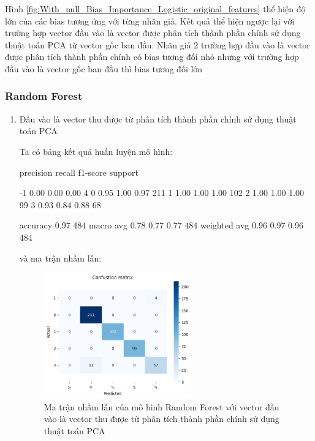 \begin{enumerate}[label=(\alph*)]
    Hình \ref{fig:With_null_Bias_Importance_Logistic_original_features} thể hiện độ lớn của các bias tương ứng với từng nhãn giả.
    Kết quả thể hiện ngược lại với trường hợp vector đầu vào là vector được phân tích thành phần chính sử dụng thuật toán PCA từ vector gốc ban đầu.
    Nhãn giả 2 trường hợp đầu vào là vector được phân tích thành phần chính có bias tương đối nhỏ nhưng với trường hợp đầu vào là vector gốc ban đầu thì bias tương đối lớn

\end{enumerate}

\subsubsection{Random Forest}

\begin{enumerate}[label=(\alph*)]
    \item Đầu vào là vector thu được từ phân tích thành phần chính sử dụng thuật toán PCA 
    
    Ta có bảng kết quả huấn luyện mô hình:

    \begin{python}
        precision    recall  f1-score   support

        -1       0.00      0.00      0.00         4
         0       0.95      1.00      0.97       211
         1       1.00      1.00      1.00       102
         2       1.00      1.00      1.00        99
         3       0.93      0.84      0.88        68

  accuracy                           0.97       484
 macro avg       0.78      0.77      0.77       484
weighted avg       0.96      0.97      0.96       484
    \end{python}

    và ma trận nhầm lẫn:

    \begin{figure}[H]
        \centering
        \includegraphics[width=0.6\textwidth]{figures/Thanh/Data_Analysis/With_null_confusion_matrix_Random_Forest_PCA_features.png}
        \caption{Ma trận nhầm lẫn của mô hình Random Forest với vector đầu vào là vector thu được từ phân tích thành phần chính sử dụng thuật toán PCA}
        \label{fig:With_null_confusion_matrix_Random_Forest_PCA_features}
    \end{figure}


\end{enumerate}
